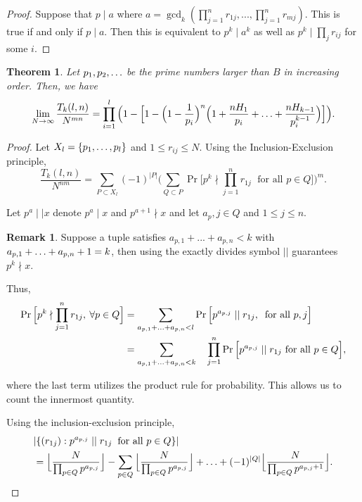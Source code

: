 \documentclass[12pt]{amsart}
\newtheorem{theorem}{Theorem}[subsection]
\theoremstyle{definition}
\newtheorem*{remark}{Remark}
\begin{document}
\begin{proof}
	Suppose that $p \mid a$ where $a = \gcd_k(\prod_{j=1}^n r_{1j}, ...,\prod_{j=1}^n r_{mj})$. This is true if and only if $p \mid a$. Then this is equivalent to $p^k \mid a^k$ as well as $p^k \mid \prod_j r_{ij}$ for some $i$.
\end{proof}

\begin{theorem}
	Let \(p_1, p_2,\mathellipsis\) be the prime numbers larger than \(B\) in increasing order. Then, we have
	$$\lim_{N\to\infty} \frac{T_k(l,n)}{N^{mn}}=\prod_{i=1}^l\Big(1-\Big[1-\Big(1-\frac{1}{p_i}\Big)^n\Big(1+\frac{nH_1}{p_i}+\mathellipsis+\frac{nH_{k-1}}{p_i^{k-1}}\Big)\Big]\Big).$$
\end{theorem}

\begin{proof}
	Let \(X_l=\{p_1,\mathellipsis,p_l\}\) and \(1\leq r_{ij}\leq N\). Using the Inclusion-Exclusion principle, 
$$\frac{T_k(l,n)}{N^{nm}} = \sum_{P\subset X_l}(-1)^{|P|}\Big(\sum_{Q\subset P}\Pr\Big[p^k\nmid \prod_{j=1}^{n}r_{1j} \; \text{ for all } p\in Q \Big]\Big)^m.$$
	
	Let \(p^a \mid\mid x\) denote \(p^a\mid x\) and \(p^{a+1}\nmid x\) and let \(a_p,j\in Q\) and \(1\leq j \leq n\).
	
    \begin{remark}
		Suppose a tuple satisfies \(a_{p,1}+... +a_{p,n}<k\) with \(a_{p,1}+\mathellipsis+a_{p,n}+1=k\), then using the exactly divides symbol \(||\) guarantees \(p^k \nmid x\).
    \end{remark} 
	
Thus,
        \begin{align*}
		\Pr\Big[p^k\nmid \prod_{j=1}^{n}r_{1j},\:\forall p\in Q\Big] &= \sum_{a_{p,1}+\mathellipsis+a_{p,n}<l}\Pr\Big[p^{a_{p,j}} \mid\mid r_{1j},\: \text{ for all } p,j\Big]\\
		&=\sum_{a_{p,1}+\mathellipsis+a_{p,n}<k}\quad\prod_{j=1}^{n}\Pr\Big[p^{a_{p,j}} \mid\mid r_{1j} \text{ for all } p\in Q\Big],  
	\end{align*}
	
	\noindent where the last term utilizes the product rule for probability. This allows us to count the innermost quantity. 
	
	Using the inclusion-exclusion principle, 
	\begin{align*}
		&|\{(r_{1j}): p^{a_{{p,j}}}\mid\mid r_{1j} \: \text{ for all } p\in Q\}|\\ &= \Big\lfloor\frac{N}{\prod_{p\in Q}p^{a_{p,j}}}\Big\rfloor-\sum_{p\in Q}\Big\lfloor \frac{N}{\prod_{p\in Q}p^{a_{p,j}}}\Big\rfloor+\mathellipsis+(-1)^{|Q|}\Big\lfloor\frac{N}{\prod_{p\in Q}p^{a_{p,j}+1}}\Big\rfloor.
	\end{align*}
	

\end{proof}
\end{document}

